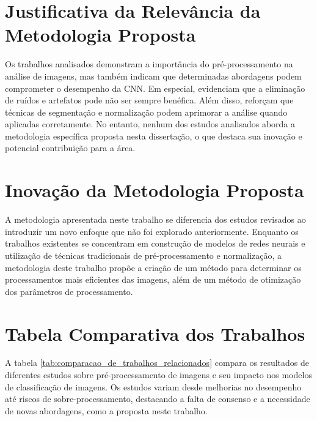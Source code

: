 \section{Justificativa da Relevância da Metodologia Proposta}

Os trabalhos analisados demonstram a importância do pré-processamento na análise de imagens, mas também indicam que determinadas abordagens podem comprometer o desempenho da CNN. Em especial,  evidenciam que a eliminação de ruídos e artefatos pode não ser sempre benéfica. Além disso,  reforçam que técnicas de segmentação e normalização podem aprimorar a análise quando aplicadas corretamente. No entanto, nenhum dos estudos analisados aborda a metodologia específica proposta nesta dissertação, o que destaca sua inovação e potencial contribuição para a área.

\section{Inovação da Metodologia Proposta}

A metodologia apresentada neste trabalho se diferencia dos estudos revisados ao introduzir um novo enfoque que não foi explorado anteriormente. Enquanto os trabalhos existentes se concentram em construção de modelos de redes neurais e utilização de técnicas tradicionais de pré-processamento e normalização, a metodologia deste trabalho propõe a criação de um método para determinar os processamentos mais eficientes das imagens, além de um método de otimização dos parâmetros de processamento.

\section{Tabela Comparativa dos Trabalhos}

A tabela \ref{tab:comparacao_de_trabalhos_relacionados} compara os resultados de diferentes estudos sobre pré-processamento de imagens e seu impacto nos modelos de classificação de imagens. Os estudos variam desde melhorias no desempenho até riscos de sobre-processamento, destacando a falta de consenso e a necessidade de novas abordagens, como a proposta neste trabalho.

